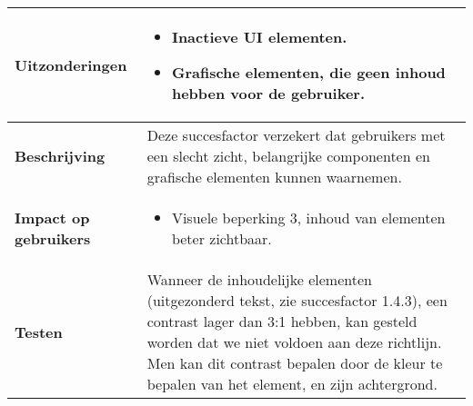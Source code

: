 \begin{table}[H]
\begin{tabular}{|l|p{12cm}|}
          \hline
        \textbf{Uitzonderingen}     & 
        \begin{itemize}
            \item Inactieve UI elementen.
            \item Grafische elementen, die geen inhoud hebben voor de gebruiker.
        \end{itemize}                                                                                                                                                                                                   \\ 
            \hline
            \textbf{Beschrijving}                 & Deze succesfactor verzekert dat gebruikers met een slecht zicht, belangrijke componenten en grafische elementen kunnen waarnemen.  \\ 
            \hline
            \textbf{Impact op gebruikers}         &  
            \begin{itemize}
                \item Visuele beperking 3, inhoud van elementen beter zichtbaar.
            \end{itemize}                                                                                                                                                                                                                                                                                                                                                                                                                    \\ 
            \hline
            \textbf{Testen}                       & Wanneer de inhoudelijke elementen (uitgezonderd tekst, zie succesfactor 1.4.3),  een contrast lager  dan 3:1 hebben, kan gesteld worden dat we niet voldoen aan deze richtlijn. Men kan dit contrast bepalen door de kleur te bepalen van het element, en zijn achtergrond.                                                                                                                                                                                                                  \\
            \hline
        \end{tabular}
        
\end{table}




